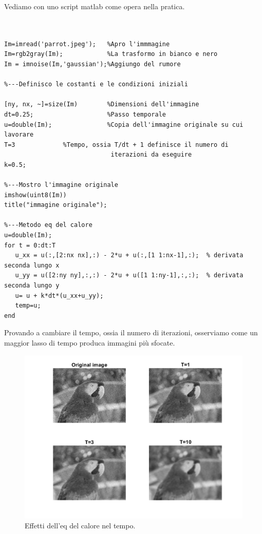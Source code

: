 \vspace{1em}

Vediamo con uno script matlab come opera nella pratica. \\

\begin{lstlisting}


Im=imread('parrot.jpeg');   %Apro l'immmagine
Im=rgb2gray(Im);            %La trasformo in bianco e nero
Im = imnoise(Im,'gaussian');%Aggiungo del rumore

%---Definisco le costanti e le condizioni iniziali

[ny, nx, ~]=size(Im)        %Dimensioni dell'immagine
dt=0.25;                    %Passo temporale
u=double(Im);               %Copia dell'immagine originale su cui lavorare
T=3			    %Tempo, ossia T/dt + 1 definisce il numero di
                             iterazioni da eseguire
k=0.5;

%---Mostro l'immagine originale
imshow(uint8(Im))
title("immagine originale"); 

%---Metodo eq del calore
u=double(Im);
for t = 0:dt:T
   u_xx = u(:,[2:nx nx],:) - 2*u + u(:,[1 1:nx-1],:);  % derivata seconda lungo x
   u_yy = u([2:ny ny],:,:) - 2*u + u([1 1:ny-1],:,:);  % derivata seconda lungo y
   u= u + k*dt*(u_xx+u_yy);
   temp=u;
end

\end{lstlisting}
\vspace{1em}
Provando a cambiare il tempo, ossia il numero di iterazioni, osserviamo come un maggior lasso di tempo produca immagini più sfocate. \\

\begin{figure}[htb] 
\centering
\includegraphics[scale=0.4]{Pictures/Risultati/eq del calore.png}
\caption{Effetti dell'eq del calore nel tempo.}\label{fig:figura}
\end{figure}


